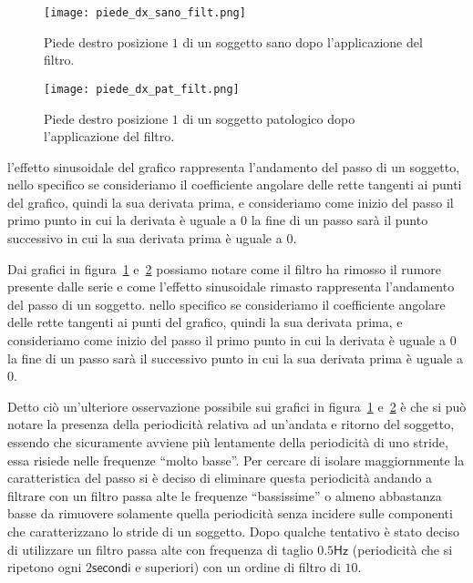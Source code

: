 \begin{figure}[H]
    \centering
    \texttt{[image: piede\_dx\_sano\_filt.png]}
    \caption{Piede destro posizione $1$ di un soggetto sano dopo l'applicazione del filtro.}
    \label{fig:piede_dx_1_sano_filt}
\end{figure}

\begin{figure}[H]
    \centering
    \texttt{[image: piede\_dx\_pat\_filt.png]}
    \caption{Piede destro posizione $1$ di un soggetto patologico dopo l'applicazione del filtro.}
    \label{fig:piede_dx_1_pat_filt}
\end{figure}

l'effetto sinusoidale del grafico rappresenta l'andamento del passo di un soggetto, 
nello specifico se consideriamo il coefficiente angolare delle rette tangenti ai punti del 
grafico, quindi la sua derivata prima, e consideriamo come inizio del passo il 
primo punto in cui la derivata è uguale a $0$ la fine di un passo sarà il punto successivo 
in cui la sua derivata prima è uguale a $0$. 


Dai grafici in figura~\ref{fig:piede_dx_1_sano_filt} 
e~\ref{fig:piede_dx_1_pat_filt} possiamo notare come il filtro ha rimosso il rumore 
presente dalle serie e come l'effetto sinusoidale rimasto rappresenta l'andamento del passo di un soggetto.
nello specifico se consideriamo il coefficiente angolare delle rette tangenti ai punti del 
grafico, quindi la sua derivata prima, e consideriamo come inizio del passo il 
primo punto in cui la derivata è uguale a $0$ la fine di un passo sarà il successivo punto 
in cui la sua derivata prima è uguale a $0$. 

Detto ciò un'ulteriore osservazione possibile sui grafici in figura~\ref{fig:piede_dx_1_sano_filt} 
e~\ref{fig:piede_dx_1_pat_filt} è che si può notare la presenza della periodicità
relativa ad un'andata e ritorno del soggetto,
essendo che sicuramente avviene più lentamente della periodicità di uno stride, essa
risiede nelle frequenze ``molto basse''. 
Per cercare di isolare maggiornmente la caratteristica del passo
si è deciso di eliminare questa periodicità
andando a filtrare con un filtro passa alte le frequenze ``bassissime'' o almeno
abbastanza basse da rimuovere solamente quella periodicità senza 
incidere sulle componenti che caratterizzano lo stride di un soggetto. 
Dopo qualche tentativo
è stato deciso di utilizzare un filtro passa alte con frequenza di taglio $0.5\mathsf{Hz}$
(periodicità che si ripetono ogni $2\mathsf{secondi}$ e superiori) con un ordine di filtro di $10$.

